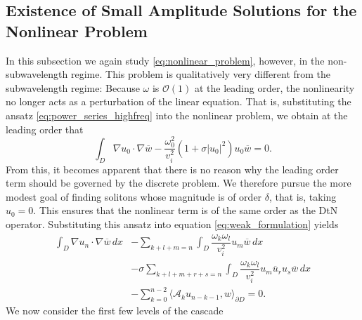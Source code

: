 \documentclass[a4paper,reqno,twoside]{amsart}
\numberwithin{equation}{section}
\theoremstyle{definition}
\newcommand{\<}{\ensuremath \leq}
\renewcommand{\>}{\ensuremath \geq}
\begin{document}

\subsection{Existence of Small Amplitude Solutions for the Nonlinear Problem}
In this subsection we again study \eqref{eq:nonlinear_problem}, however, in the non-subwavelength regime.  This problem is qualitatively very different from the subwavelength regime: Because $\omega$ is $\mathcal{O}(1)$ at the leading order, the nonlinearity no longer acts as a perturbation of the linear equation. That is, substituting the ansatz \eqref{eq:power_series_highfreq} into the nonlinear problem, we obtain at the leading order that
\begin{equation}
    \int_{D}\nabla u_0 \cdot \nabla \overline{w} - \dfrac{\omega_0^2}{v_i^2}(1 + \sigma \lvert u_0\rvert^2)u_0\overline{w}=0.
\end{equation}
From this, it becomes apparent that there is no reason why the leading order term should be governed by the discrete problem. We therefore pursue the more modest goal of finding solitons whose magnitude is of order $\delta$, that is, taking $u_0=0$. This ensures that the nonlinear term is of the same order as the DtN operator. Substituting this ansatz into equation \eqref{eq:weak_formulation} yields
\begin{equation}\label{eq:cascade1NS}
    \begin{aligned}
        \int_{D} \nabla u_n \cdot \nabla \overline{w} \, dx 
        &- \sum_{k+l+m=n}\int_D \dfrac{\omega_k\omega_l}{v_i^2} u_m \overline{w} \, dx \\
        &- \sigma \sum_{k+l+m+r+s=n}\int_D \dfrac{\omega_k\omega_l}{v_i^2}u_m\overline{u}_r u_s\overline{w} \, dx \\
        &- \sum_{k=0}^{n-2}\langle\mathcal{A}_k u_{n-k-1},w\rangle_{\partial D} = 0.
    \end{aligned}
\end{equation}
We now consider the first few levels of the cascade
\end{document}
